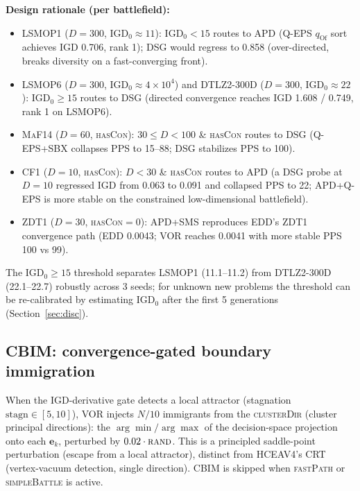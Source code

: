 \documentclass[preprint,12pt]{elsarticle}
\begin{document}
\textbf{Design rationale (per battlefield):}
\begin{itemize}
\item \textsc{LSMOP1} ($D=300$, $\mathrm{IGD}_0\approx 11$):
  $\mathrm{IGD}_0<15$ routes to \textsc{APD} (Q-EPS $q_{\mathrm{Of}}$ sort
  achieves IGD 0.706, rank 1); \textsc{DSG} would regress to 0.858
  (over-directed, breaks diversity on a fast-converging front).
\item \textsc{LSMOP6} ($D=300$, $\mathrm{IGD}_0\approx 4\times10^4$) and
  \textsc{DTLZ2}-300D ($D=300$, $\mathrm{IGD}_0\approx 22$):
  $\mathrm{IGD}_0\ge 15$ routes to \textsc{DSG} (directed convergence
  reaches IGD 1.608 / 0.749, rank 1 on \textsc{LSMOP6}).
\item \textsc{MaF14} ($D=60$, \textsc{hasCon}): $30\le D<100$ \& \textsc{hasCon}
  routes to \textsc{DSG} (Q-EPS+\textsc{SBX} collapses PPS to 15--88;
  \textsc{DSG} stabilizes PPS to 100).
\item \textsc{CF1} ($D=10$, \textsc{hasCon}): $D<30$ \& \textsc{hasCon}
  routes to \textsc{APD} (a \textsc{DSG} probe at $D=10$ regressed IGD from
  0.063 to 0.091 and collapsed PPS to 22; \textsc{APD}+Q-EPS is more stable
  on the constrained low-dimensional battlefield).
\item \textsc{ZDT1} ($D=30$, \textsc{hasCon}$=0$):
  \textsc{APD}+\textsc{SMS} reproduces EDD's \textsc{ZDT1} convergence path
  (EDD 0.0043; VOR reaches 0.0041 with more stable PPS 100 vs 99).
\end{itemize}
The $\mathrm{IGD}_0\ge 15$ threshold separates \textsc{LSMOP1}
(11.1--11.2) from \textsc{DTLZ2}-300D (22.1--22.7) robustly across 3 seeds;
for unknown new problems the threshold can be re-calibrated by estimating
$\mathrm{IGD}_0$ after the first 5 generations (Section~\ref{sec:disc}).

\subsection{\textsc{CBIM}: convergence-gated boundary immigration}
\label{sec:cbim}
When the IGD-derivative gate detects a local attractor (stagnation
$\mathrm{stagn}\in[5,10]$), VOR injects $N/10$ immigrants from the
\textsc{clusterDir} (cluster principal directions): the
$\arg\min/\arg\max$ of the decision-space projection onto each
$\mathbf{e}_k$, perturbed by $0.02\cdot\textsc{rand}$. This is a
principled saddle-point perturbation (escape from a local attractor),
distinct from HCEAV4's \textsc{CRT} (vertex-vacuum detection, single
direction). \textsc{CBIM} is skipped when \textsc{fastPath} or
\textsc{simpleBattle} is active.
\end{document}
